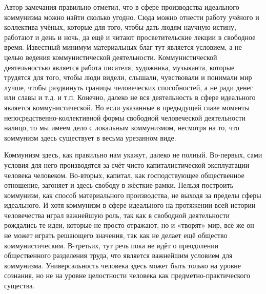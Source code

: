\documentclass[../main]{subfiles}
\begin{document}
Автор замечания правильно отметил, что в сфере производства идеального коммунизма можно найти сколько угодно. Сюда можно отнести работу учёного и коллектива учёных, которые для того, чтобы дать людям научную истину, работают и день и ночь, да ещё и читают просветительские лекции в свободное время. Известный минимум материальных благ тут является условием, а не целью ведения коммунистической деятельности. Коммунистической деятельностью является работа писателя, художника, музыканта, которые трудятся для того, чтобы люди видели, слышали, чувствовали и понимали мир лучше, чтобы раздвинуть границы человеческих способностей, а не ради денег или славы и т.д. и т.п. Конечно, далеко не вся деятельность в сфере идеального является коммунистической. Но если указанные в предыдущей главе моменты непосредственно-коллективной формы свободной человеческой деятельности налицо, то мы имеем дело с локальным коммунизмом, несмотря на то, что коммунизм здесь существует в весьма урезанном виде.

Коммунизм здесь, как правильно нам укажут, далеко не полный. Во-первых, сами условия для него производятся за счёт чисто капиталистической эксплуатации человека человеком. Во-вторых, капитал, как господствующее общественное отношение, загоняет и здесь свободу в жёсткие рамки. Нельзя построить коммунизм, как способ материального производства, не выходя за пределы сферы идеального. И хотя коммунизм в сфере идеального на протяжении всей истории человечества играл важнейшую роль, так как в свободной деятельности рождались те идеи, которые не просто отражают, но и «творят» мир, всё же он не может играть решающего значения, так как не делает ещё общество коммунистическим. В-третьих, тут речь пока не идёт о преодолении общественного разделения труда, что является важнейшим условием для коммунизма. Универсальность человека здесь может быть только на уровне сознания, но не на уровне целостности человека как предметно-практического существа.
\end{document}

